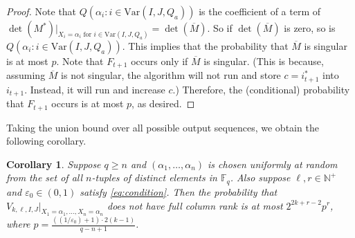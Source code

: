 \documentclass[11pt]{article}
\theoremstyle{plain}
\newtheorem{cor}[thm]{Corollary}
\theoremstyle{definition}
\theoremstyle{remark}
\newcommand{\N}{\mathbb{N}}
\newcommand{\F}{\mathbb{F}}
\newcommand{\eps}{\varepsilon}
\newcommand{\var}{\mathrm{Var}}
\begin{document}
\begin{proof}
Note that $Q(\alpha_i: i\in \var(I,J,Q_a))$ is the coefficient of a term of $\det(M^*)|_{X_i=\alpha_i \text{ for } i\in\var(I,J,Q_a)}=\det(\overline{M})$.
So if $\det(\overline{M})$ is zero, so is $Q(\alpha_i: i\in \var(I,J,Q_a))$.
This implies that the probability that $\overline{M}$ is singular is at most $p$.
Note that $F_{t+1}$ occurs only if $\overline{M}$ is singular.
(This is because, assuming $\overline{M}$ is not singular, the algorithm will not run  and store $c=i_{t+1}^*$ into $i_{t+1}$. Instead, it will run  and increase $c$.) Therefore, the (conditional) probability that $F_{t+1}$ occurs is at most $p$, as desired.
\end{proof}

Taking the union bound over all possible output sequences, we obtain the following corollary.

\begin{cor}\label{cor:prob-bound} 
Suppose $q\geq n$ and $(\alpha_1,\dots,\alpha_n)$ is chosen uniformly at random from the set of all $n$-tuples of distinct elements in $\F_q$.
Also suppose $\ell, r\in\N^+$ and $\eps_0\in (0,1)$ satisfy \eqref{eq:condition}.
Then the probability that $V_{k,\ell,I,J}|_{X_1=\alpha_1,\dots,X_n=\alpha_n}$ does not have full column rank is at most $2^{2k+r-2}p^r$, where $p=\frac{((1/\eps_0)+1)\cdot 2(k-1)}{q-n+1}$.
\end{cor}
\end{document}
